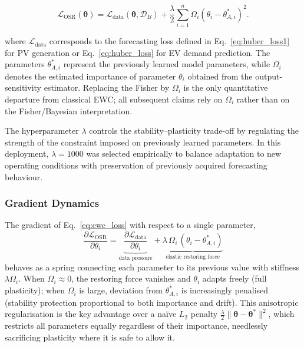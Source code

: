 \documentclass[journal]{IEEEtran}
\newcommand{\loss}{\mathcal{L}}
\newcommand{\params}{\bm{\theta}}
\newcommand{\paramsstar}{\bm{\theta}^{*}}
\newcommand{\ewclambda}{\lambda}
\begin{document}
\begin{equation}
\mathcal{L}_{\mathrm{OSR}}(\params)
=
\mathcal{L}_{\mathrm{data}}(\params,\mathcal{D}_B)
+
\frac{\lambda}{2}
\sum_{i=1}^{n}
\Omega_{i}
(\theta_i-\theta_{A,i}^{*})^2 .
\label{eq:ewc_loss}
\end{equation}

where $\loss_{\mathrm{data}}$ corresponds to the forecasting loss
defined in Eq.~\eqref{eq:huber_loss1} for PV generation or
Eq.~\eqref{eq:huber_loss} for EV demand prediction. The parameters
$\theta_{A,i}^{*}$ represent the previously learned model parameters,
while $\Omega_{i}$ denotes the estimated importance of parameter
$\theta_i$ obtained from the output-sensitivity estimator. Replacing the
Fisher by $\Omega_i$ is the only quantitative departure from classical
EWC; all subsequent claims rely on $\Omega_i$ rather than on the
Fisher/Bayesian interpretation.

The hyperparameter $\ewclambda$ controls the stability--plasticity
trade-off by regulating the strength of the constraint imposed on
previously learned parameters. In this deployment, $\ewclambda=1000$ was
selected empirically to balance adaptation to new operating conditions
with preservation of previously acquired forecasting behaviour.
\subsubsection{Gradient Dynamics}

The gradient of Eq.~\eqref{eq:ewc_loss} with respect to a single
parameter,
\begin{equation}
    \frac{\partial \loss_{\mathrm{OSR}}}{\partial \theta_i} =
    \underbrace{\frac{\partial \loss_{\mathrm{data}}}{\partial \theta_i}}_{\text{data pressure}}
    + \underbrace{\ewclambda\, \Omega_{i}\,(\theta_i - \theta_{A,i}^*)}_{\text{elastic restoring force}}
    \label{eq:gradient}
\end{equation}
behaves as a spring connecting each parameter to its previous value with
stiffness $\ewclambda \Omega_{i}$. When $\Omega_{i}\approx 0$, the
restoring force vanishes and $\theta_i$ adapts freely (full plasticity);
when $\Omega_{i}$ is large, deviation from $\theta_{A,i}^*$ is
increasingly penalised (stability protection proportional to both
importance and drift). This anisotropic regularisation is the key
advantage over a na\"ive $L_2$ penalty
$\tfrac{\lambda}{2}\|\params-\paramsstar\|^2$, which restricts all
parameters equally regardless of their importance, needlessly
sacrificing plasticity where it is safe to allow it.
\end{document}
